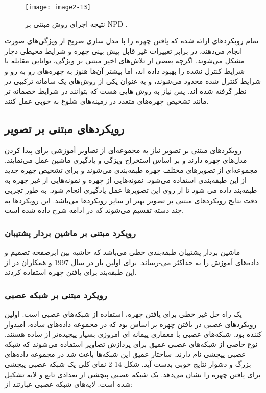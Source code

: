  \begin{figure}[h]
\centering
  \texttt{[image: image2-13]}
  \caption{نتیجه اجرای روش مبتنی بر NPD \cite{ref1}.}
  \label{image2-13}
\end{figure}

\noindent
تمام رویکرد‌های ارائه شده که یافتن چهره را با مدل سازی صریح از ویژگی‌های صورت انجام می‌دهند، در برابر تغییرات غیر قابل پیش بینی چهره و شرایط محیطی دچار مشکل می‌شوند. اگرچه بعضی از تلاش‌های اخیر مبتنی بر ویژگی، توانایی مقابله با شرایط کنترل نشده را بهبود داده اند، اما بیشتر آن‌ها هنوز به چهره‌های رو به رو و شرایط کنترل شده محدود می‌شوند، و به عنوان یکی از روش‌های یک سامانه ترکیبی در نظر گرفته شده اند. پس نیاز به روش-هایی هست که بتوانند در شرایط خصمانه تر مانند تشخیص چهره‌های متعدد در زمینه‌های شلوغ به خوبی عمل کنند.

 \subsection{رویکردهای مبتنی بر تصویر}
رویکردهای مبتنی بر تصویر نیاز به مجموعه‌ای از تصاویر آموزشی برای پیدا کردن مدل‌های چهره دارند و بر اساس استخراج ویژگی و یادگیری ماشین عمل می‌نمایند. مجموعه‌ای از تصویر‌های مختلف چهره طبقه‌بندی می‌شوند و برای تشخیص چهره جدید از این طبقه‌بندی استفاده می‌شود. نمونه‌هایی از چهره و نمونه‌هایی از غیر چهره به طبقه‌بند داده می-شود تا از روی این تصویرها عمل یادگیری انجام شود. به طور تجربی دقت نتایج رویکردهای مبتنی بر تصویر بهتر از سایر رویکرد‌ها می‌باشد. این رویکردها به چند دسته تقسیم می‌شوند که در ادامه شرح داده شده است. 

 \subsubsection{رویکرد مبتنی بر ماشین بردار پشتیبان}
ماشین‌ بردار پشتیبان  طبقه‌بندی خطی می‌باشد که حاشیه بین ابرصفحه تصمیم و داده‌های آموزش را به حداکثر می-رساند. برای اولین بار در سال 1997  و همکاران در \cite{609310} از این طبقه‌بند برای یافتن چهره استفاده کردند.

 \subsubsection{رویکرد مبتنی بر شبکه‌ عصبی}
یک راه حل غیر خطی برای یافتن چهره، استفاده از شبکه‌های عصبی است. اولین رویکردهای عصبی در یافتن چهره بر اساس  بود که در مجموعه داده‌های ساده، امیدوار کننده بود. شبکه‌های عصبی با معماری پیمانه ای  امروزی بسیار پیچیده‌تر از  ساده هستند. نوع خاصی از شبکه‌های عصبی عمیق برای پردازش تصاویر استفاده می‌شوند که شبکه عصبی پیچشی  نام دارند. ساختار عمیق این شبکه‌ها باعث شد در مجموعه داده‌های بزرگ و دشوار نتایج خوبی بدست آید. شکل ‏2-14 نمای کلی یک شبکه عصبی پیچشی برای یافتن چهره را نشان می‌دهد. یک شبکه عصبی پیچشی از تعدادی تابع و لایه تشکیل شده است. لایه‌های شبکه عصبی عبارتند از:

